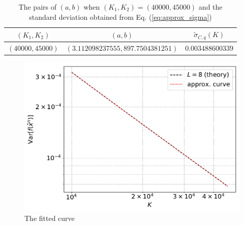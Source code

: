 \documentclass[dvipdfmx,english]{ampmt} %
\begin{document}
\begin{table}[htb]
  \centering
  \caption{The pairs of $(a,b)$ when $(K_1,K_2)=(40000,45000)$ and the standard deviation obtained from Eq. (\ref{eq:approx_sigma})}
  \begin{tabular}{ccc} \hline
    $(K_1,K_2)$      & $(a,b)$                            & $\tilde{\sigma}_{C,q}(K)$   \\ \hline 
    $(40000,45000)$  & $(3.112098237555, 897.7504381251)$ & $0.003488600339$      \\ \hline
  \end{tabular}
  \label{tab:2}
\end{table}
%
\begin{figure}[htbp]
  \centering
    \includegraphics[width=0.7\linewidth]{./figure/approx_varf_L8_10000.pdf}
    \caption{The fitted curve}
    \label{fig:fitted}
\end{figure}
%
%
\end{document}
